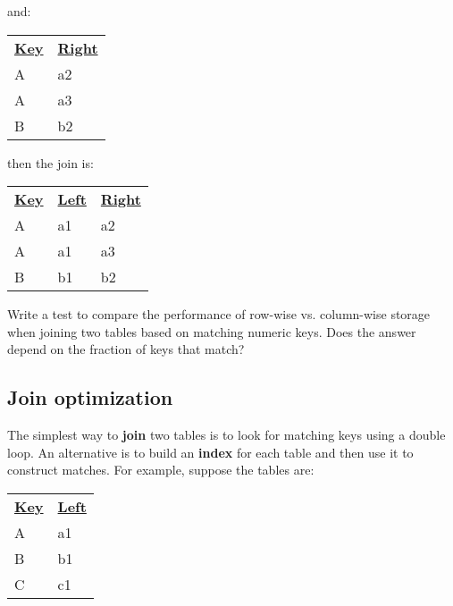 \documentclass[krantzl]{krantz}
\newcommand{\glossref}[1]{\textbf{#1}}
\begin{document}
\vspace{\baselineskip}


\noindent and:


\vspace{\baselineskip}
\begin{tabular}{ll}
\textbf{\underline{Key}} & \textbf{\underline{Right}} \\
A & a2 \\
A & a3 \\
B & b2 \\
\end{tabular}

\vspace{\baselineskip}


\noindent then the join is:


\vspace{\baselineskip}
\begin{tabular}{lll}
\textbf{\underline{Key}} & \textbf{\underline{Left}} & \textbf{\underline{Right}} \\
A & a1 & a2 \\
A & a1 & a3 \\
B & b1 & b2 \\
\end{tabular}

\vspace{\baselineskip}


Write a test to compare the performance of row-wise vs. column-wise storage
when joining two tables based on matching numeric keys.
Does the answer depend on the fraction of keys that match?

\subsection*{Join optimization}


The simplest way to \glossref{join} two tables is
to look for matching keys using a double loop.
An alternative is to build an \glossref{index} for each table
and then use it to construct matches.
For example, suppose the tables are:


\vspace{\baselineskip}
\begin{tabular}{ll}
\textbf{\underline{Key}} & \textbf{\underline{Left}} \\
A & a1 \\
B & b1 \\
C & c1 \\
\end{tabular}
\end{document}
